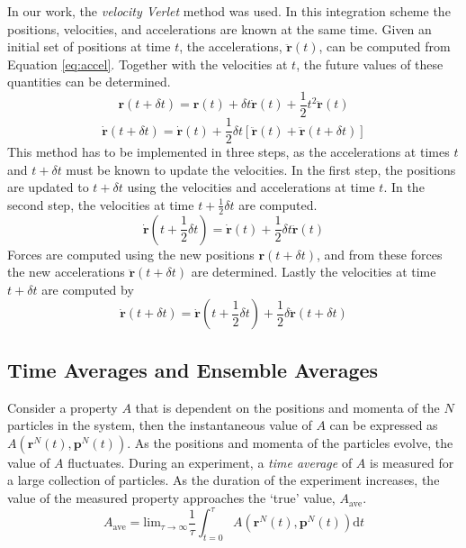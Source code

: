 In our work, the \textit{velocity Verlet} method was used. In this
integration scheme the positions, velocities, and accelerations are
known at the same time. Given an initial set of positions at time $t$,
the accelerations, $\mathbf{\ddot{r}}(t)$, can be computed from
Equation \eqref{eq:accel}. Together with the velocities at $t$, the
future values of these quantities can be determined.
\begin{equation}\label{eq:vv-r}
\mathbf{r}(t+\delta t) = \mathbf{r}(t) + \delta t \mathbf{\dot{r}}(t) +
\frac{1}{2}t^2\mathbf{\ddot{r}}(t)
\end{equation}
\begin{equation}\label{eq:vv-v}
\mathbf{\dot{r}}(t+ \delta t) = \mathbf{\dot{r}}(t) + \frac{1}{2}\delta
t[\mathbf{\ddot{r}}(t) + \mathbf{\ddot{r}}(t + \delta t)]
\end{equation}
This method has to be implemented in three steps, as the accelerations
at times $t$ and $t + \delta t$ must be known to update the
velocities. In the first step, the positions are updated to
$t + \delta t$ using the velocities and accelerations at time $t$. In
the second step, the velocities at time $t + \frac{1}{2} \delta t$ are
computed.
\begin{equation}\label{eq:vv-v2}
\mathbf{\dot{r}}(t+\frac{1}{2}\delta t) = \mathbf{\dot{r}}(t) + \frac{1}{2}\delta t
\mathbf{\ddot{r}}(t)
\end{equation}
Forces are computed using the new positions $\mathbf{r}(t + \delta
t)$, and from these forces the new accelerations $\mathbf{\ddot{r}}(t +
\delta t)$ are determined. Lastly the velocities at time $t + \delta
t$ are computed by
\begin{equation}\label{eq:vv-v3}
\mathbf{\dot{r}}(t+\delta t) = \mathbf{\dot{r}}(t+\frac{1}{2}\delta t) +
\frac{1}{2}\delta \mathbf{\ddot{r}}(t + \delta t)
\end{equation}


\subsection{Time Averages and Ensemble Averages}
Consider a property $A$ that is dependent on the positions and momenta
of the $N$ particles in the system, then the instantaneous value of
$A$ can be expressed as $A(\mathbf{r}^N(t),\mathbf{p}^N(t))$. As the
positions and momenta of the particles evolve, the value of $A$
fluctuates. During an experiment, a \textit{time average} of $A$ is
measured for a large collection of particles. As the duration of the
experiment increases, the value of the measured property approaches
the `true' value, $A_{\mathrm{ave}}$.
\begin{equation}\label{eq:A-ave}
A_{\mathrm{ave}} = \mathrm{lim}_{\tau \to \infty} \frac{1}{\tau} \int_{t=0}^{\tau}
A(\mathbf{r}^N(t),\mathbf{p}^N(t))\mathrm{d}t
\end{equation}

